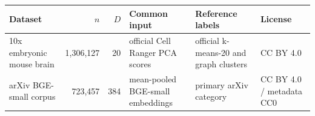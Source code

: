 \begin{tabular}{@{}lrrlll@{}}
\toprule
Dataset & $n$ & $D$ & Common input & Reference labels & License \\
\midrule
10x embryonic mouse brain & 1,306,127 & 20 & official Cell Ranger PCA scores & official k-means-20 and graph clusters & CC BY 4.0 \\
arXiv BGE-small corpus & 723,457 & 384 & mean-pooled BGE-small embeddings & primary arXiv category & CC BY 4.0 / metadata CC0 \\
\bottomrule
\end{tabular}
